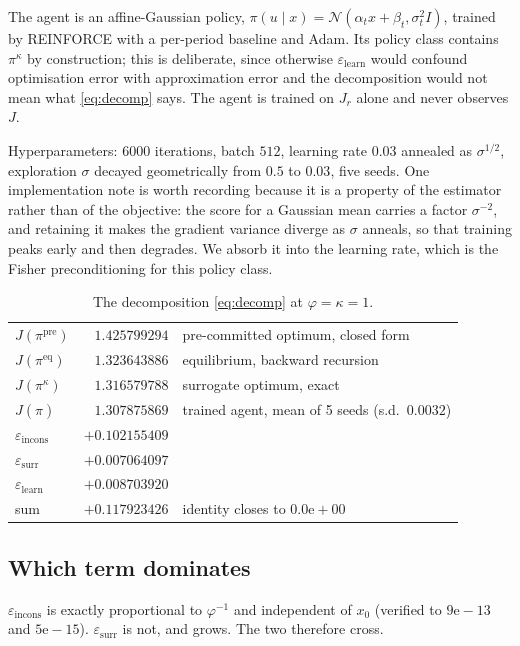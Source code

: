 \documentclass[11pt,a4paper]{article}
\theoremstyle{plain}
\theoremstyle{definition}
\theoremstyle{remark}
\newcommand{\pipre}{\pi^{\mathrm{pre}}}
\newcommand{\pieq}{\pi^{\mathrm{eq}}}
\newcommand{\pir}{\pi^{\kappa}}
\newcommand{\pihat}{\widehat{\pi}}
\newcommand{\epsincons}{\varepsilon_{\mathrm{incons}}}
\newcommand{\epssurr}{\varepsilon_{\mathrm{surr}}}
\newcommand{\epslearn}{\varepsilon_{\mathrm{learn}}}
\begin{document}
The agent is an affine-Gaussian policy,
$\pi(u\mid x)=\mathcal{N}(\alpha_tx+\beta_t,\sigma_t^2I)$, trained by REINFORCE
with a per-period baseline and Adam. Its policy class contains $\pir$ by
construction; this is deliberate, since otherwise $\epslearn$ would confound
optimisation error with approximation error and the decomposition would not mean
what \eqref{eq:decomp} says. The agent is trained on $J_r$ alone and never
observes $J$.

Hyperparameters: $6000$ iterations, batch $512$, learning rate $0.03$ annealed as
$\sigma^{1/2}$, exploration $\sigma$ decayed geometrically from $0.5$ to $0.03$,
five seeds. One implementation note is worth recording because it is a property
of the estimator rather than of the objective: the score for a Gaussian mean
carries a factor $\sigma^{-2}$, and retaining it makes the gradient variance
diverge as $\sigma$ anneals, so that training peaks early and then degrades. We
absorb it into the learning rate, which is the Fisher preconditioning for this
policy class.

\begin{table}[h]\centering\small
\begin{tabular}{lrl}
\toprule
$J(\pipre)$ & $1.425799294$ & pre-committed optimum, closed form\\
$J(\pieq)$ & $1.323643886$ & equilibrium, backward recursion\\
$J(\pir)$ & $1.316579788$ & surrogate optimum, exact\\
$J(\pihat)$ & $1.307875869$ & trained agent, mean of 5 seeds (s.d.\ $0.0032$)\\
\midrule
$\epsincons$ & $+0.102155409$ & \\
$\epssurr$ & $+0.007064097$ & \\
$\epslearn$ & $+0.008703920$ & \\
\midrule
sum & $+0.117923426$ & identity closes to $0.0\mathrm{e}{+}00$\\
\bottomrule
\end{tabular}
\caption{The decomposition \eqref{eq:decomp} at $\varphi=\kappa=1$.}
\end{table}

\subsection{Which term dominates}

$\epsincons$ is exactly proportional to $\varphi^{-1}$ and independent of $x_0$
(verified to $9\mathrm{e}{-}13$ and $5\mathrm{e}{-}15$). $\epssurr$ is not, and
grows. The two therefore cross.
\end{document}
